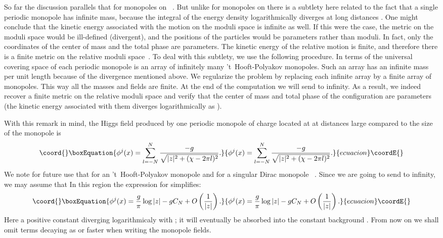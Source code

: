 \documentclass[a4paper,12pt, amsfonts, amssymb]{article}
\providecommand{\RR}{{\mathbb R}}
\renewcommand{\SS}{{\mathbb S}}
\providecommand{\ra}{\rightarrow}
\begin{document}
So far the discussion parallels that for monopoles on \myHighlight{$\RR^3$}\coordHE{}~\cite{Mtn}.
But unlike for monopoles on \myHighlight{$\RR^3,$}\coordHE{} there is a subtlety here related to the
fact that a single periodic monopole has infinite mass, because the
integral of the energy density logarithmically diverges at long distances
\cite{usone, ustwo}. One might conclude that the kinetic energy
associated with the motion on the moduli space is infinite as well.
If this were the case, the metric on the moduli space would be ill-defined
(divergent), and the positions of the particles would be parameters rather
than moduli. In fact, only the coordinates of the center of mass and the total
phase are parameters. The kinetic energy of the relative motion is finite,
and therefore there is a finite metric on the relative moduli
space~\cite{ustwo}.
To deal with this subtlety, we use the following procedure. In terms of the universal covering space of \myHighlight{$\RR^2\times\SS^1,$}\coordHE{} each periodic monopole is an array of infinitely many 't~Hooft-Polyakov monopoles. Such an array has an
infinite mass per unit length because of the divergence mentioned above. We regularize the problem by replacing
each infinite array by a finite array of \coordHE{} monopoles. This way all the masses and fields are finite. At the end of the computation we will send \coordHE{} to infinity. As a result, we indeed recover a finite metric on the relative moduli space and verify that the center of mass and total phase of the configuration are parameters (the kinetic energy associated with them
diverges logarithmically as \myHighlight{$N\ra\infty$}\coordHE{}).

With this remark in mind, the Higgs field produced by one periodic monopole of charge \coordHE{} located at \coordHE{} at distances large compared to the size of the monopole is
\begin{equation}\coord{}\boxEquation{
\phi^j(x)=\sum_{l=-N}^N\frac{-g}{\sqrt{|z|^2+(\chi-2\pi l)^2}}.
}{
\phi^j(x)=\sum_{l=-N}^N\frac{-g}{\sqrt{|z|^2+(\chi-2\pi l)^2}}.
}{ecuacion}\coordE{}\end{equation}
We note for future use that for an 't~Hooft-Polyakov monopole \coordHE{} and for a singular Dirac monopole \coordHE{}~\cite{ustwo}.
Since we are going to send \coordHE{} to infinity, we may assume that \coordHE{}
In this region the expression for \coordHE{} simplifies:
\begin{equation}\coord{}\boxEquation{
\phi^j(x)=\frac{g}{\pi}\log|z|-gC_N+O\left(\frac{1}{|z|}\right).
}{
\phi^j(x)=\frac{g}{\pi}\log|z|-gC_N+O\left(\frac{1}{|z|}\right).
}{ecuacion}\coordE{}\end{equation}
Here \coordHE{} a positive constant diverging logarithmicaly with \coordHE{}; it will eventually be absorbed into the constant background \coordHE{}. From now on we shall omit terms decaying as \coordHE{} or faster when writing the monopole fields.
\end{document}
